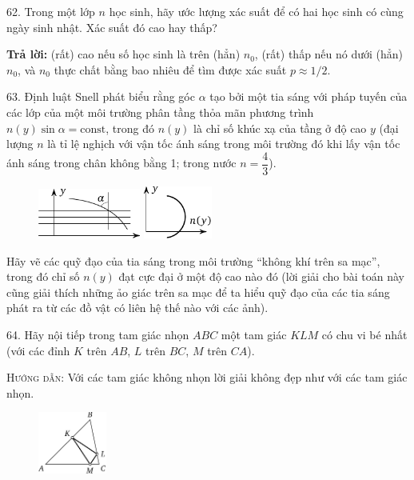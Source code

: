 \begin{problem}{62.}
	Trong một lớp $n$ học sinh, hãy ước lượng xác suất để có hai học sinh có cùng ngày sinh nhật. 
	Xác suất đó cao hay thấp?

	\textbf{Trả lời:} (rất) cao nếu số học sinh là trên (hẳn) $n_0$, (rất) thấp nếu nó dưới (hẳn) $n_0$, và $n_0$ thực chất bằng bao nhiêu để tìm được xác suất $p\approx 1/2$. 
\end{problem}

\begin{problem}{63.}
	Định luật Snell phát biểu rằng góc $\alpha$ tạo bởi một tia sáng với pháp tuyến của các lớp của một môi trường phân tầng thỏa mãn phương trình $n(y) \sin \alpha =\mbox{const}$, trong đó $n(y)$ là chỉ số khúc xạ của tầng ở độ cao $y$ (đại lượng $n$ là tỉ lệ nghịch với vận tốc ánh sáng trong môi trường đó khi lấy vận tốc ánh sáng trong chân không bằng 1; trong nước $n=\dfrac{4}{3}$).

	\begin{figure}
	\centering\includegraphics[width=0.3\textwidth]{taskbook-47} 
	\qquad
	\includegraphics[width=0.2\textwidth]{taskbook-471} 
	\end{figure}
	Hãy vẽ các quỹ đạo của tia sáng trong môi trường \enquote{không khí trên sa mạc}, trong đó chỉ số $n(y)$ đạt cực đại ở một độ cao nào đó (lời giải cho bài toán này cũng giải thích những ảo giác trên sa mạc để ta hiểu quỹ đạo của các tia sáng phát ra từ các đồ vật có liên hệ thế nào với các ảnh).
\end{problem}

\begin{problem}{64.}
	Hãy nội tiếp trong tam giác nhọn $ABC$ một tam giác $KLM$ có chu vi bé nhất (với các đỉnh $K$ trên $AB$, $L$ trên $BC$, $M$ trên $CA$).

	\textsc{Hướng dẫn}: Với các tam giác không nhọn lời giải không đẹp như với các tam giác nhọn. 
	\begin{figure}
		\centering\includegraphics[width=0.2\textwidth]{taskbook-48}
	\end{figure}
\end{problem}

